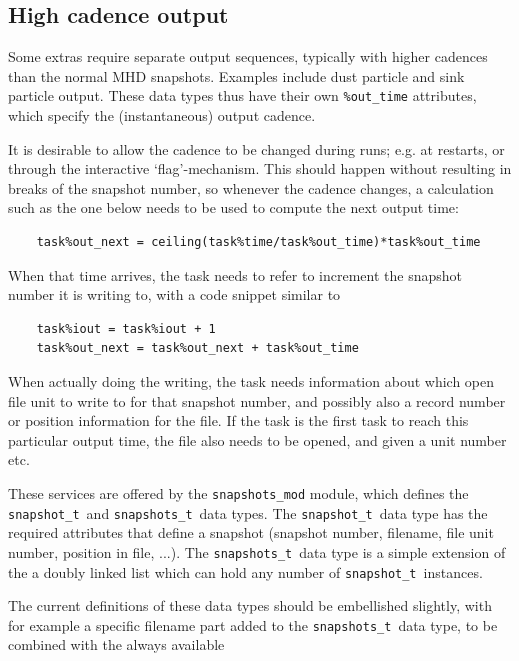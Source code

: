 \documentclass[paper=a4,fontsize=11pt]{scrartcl}
\numberwithin{equation}{section}		%
\numberwithin{figure}{section}			%
\numberwithin{table}{section}				%
\newcommand{\codecolor}{\color{Blue}}
\newcommand{\Code}[1]{{\codecolor\texttt{#1}}}
\begin{document}
\subsection{High cadence output}
Some extras require separate output sequences, typically with higher cadences than the normal MHD snapshots.  Examples include dust particle and sink particle output.  These data types thus have their own \Code{\%out\_time} attributes, which specify the (instantaneous) output cadence.

It is desirable to allow the cadence to be changed during runs; e.g. at restarts, or through the interactive `flag'-mechanism.  This should happen without resulting in breaks of the snapshot number, so whenever the cadence changes, a calculation such as the one below needs to be used to compute the next output time:
{\codecolor \begin{verbatim}
    task%out_next = ceiling(task%time/task%out_time)*task%out_time
\end{verbatim}}
When that time arrives, the task needs to refer to increment the snapshot number it is writing to, with a code snippet similar to
{\codecolor \begin{verbatim}
    task%iout = task%iout + 1
    task%out_next = task%out_next + task%out_time
\end{verbatim}}
When actually doing the writing, the task needs information about which open file unit to write to for that snapshot number, and possibly also a record number or position information for the file.
If the task is the first task to reach this particular output time, the file also needs to be opened, and given a unit number etc.

\def\snapshot{\Code{snapshot\_t}}
\def\snapshots{\Code{snapshots\_t}}
These services are offered by the \Code{snapshots\_mod} module, which defines the \snapshot\ and \snapshots\ data types.  The \snapshot\ data type has the required attributes that define a snapshot (snapshot number, filename, file unit number, position in file, ...).  The \snapshots\ data type is a simple extension of the a doubly linked list which can hold any number of \snapshot\ instances.

The current definitions of these data types should be embellished slightly, with for example a specific filename part added to the \snapshots\ data type, to be combined with the always available 
\end{document}
